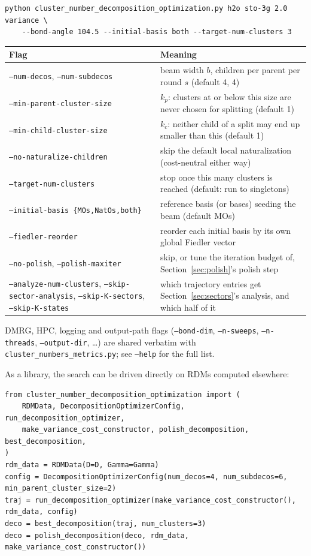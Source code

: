 \documentclass[10pt]{article}
\begin{document}
\begin{Verbatim}[fontsize=\footnotesize]
python cluster_number_decomposition_optimization.py h2o sto-3g 2.0 variance \
    --bond-angle 104.5 --initial-basis both --target-num-clusters 3
\end{Verbatim}

\begin{center}
\begin{tabularx}{\textwidth}{p{4.3cm}X}
\toprule
Flag & Meaning \\
\midrule
\texttt{--num-decos}, \texttt{--num-subdecos} & beam width $b$, children per parent per round $s$ (default 4, 4) \\
\texttt{--min-parent-cluster-size} & $k_p$: clusters at or below this size are never chosen for splitting (default 1) \\
\texttt{--min-child-cluster-size} & $k_c$: neither child of a split may end up smaller than this (default 1) \\
\texttt{--no-naturalize-children} & skip the default local naturalization (cost-neutral either way) \\
\texttt{--target-num-clusters} & stop once this many clusters is reached (default: run to singletons) \\
\texttt{--initial-basis \{MOs,NatOs,both\}} & reference basis (or bases) seeding the beam (default MOs) \\
\texttt{--fiedler-reorder} & reorder each initial basis by its own global Fiedler vector \\
\texttt{--no-polish}, \texttt{--polish-maxiter} & skip, or tune the iteration budget of, Section~\ref{sec:polish}'s polish step \\
\texttt{--analyze-num-clusters}, \texttt{--skip-sector-analysis}, \texttt{--skip-K-sectors}, \texttt{--skip-K-states} & which trajectory entries get Section~\ref{sec:sectors}'s analysis, and which half of it \\
\bottomrule
\end{tabularx}
\end{center}

DMRG, HPC, logging and output-path flags (\texttt{--bond-dim}, \texttt{--n-sweeps},
\texttt{--n-threads}, \texttt{--output-dir}, \dots) are shared verbatim with
\texttt{cluster\_numbers\_metrics.py}; see \texttt{--help} for the full list.

As a library, the search can be driven directly on RDMs computed elsewhere:

\begin{Verbatim}[fontsize=\footnotesize]
from cluster_number_decomposition_optimization import (
    RDMData, DecompositionOptimizerConfig, run_decomposition_optimizer,
    make_variance_cost_constructor, polish_decomposition, best_decomposition,
)
rdm_data = RDMData(D=D, Gamma=Gamma)
config = DecompositionOptimizerConfig(num_decos=4, num_subdecos=6, min_parent_cluster_size=2)
traj = run_decomposition_optimizer(make_variance_cost_constructor(), rdm_data, config)
deco = best_decomposition(traj, num_clusters=3)
deco = polish_decomposition(deco, rdm_data, make_variance_cost_constructor())
\end{Verbatim}
\end{document}
